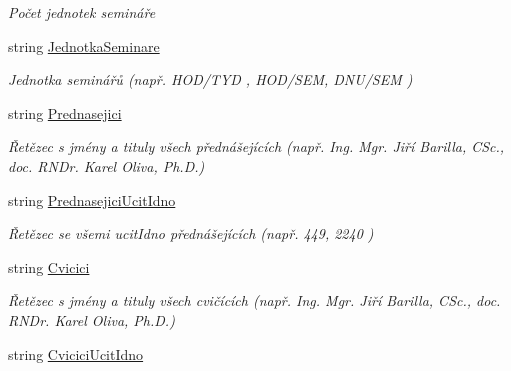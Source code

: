 \begin{DoxyCompactItemize}
\begin{DoxyCompactList}\small\item\em Počet jednotek semináře \end{DoxyCompactList}\item 
string \hyperlink{class_analyza_rozvrhu_1_1_s_t_a_g___classes_1_1_predmet_a0eb0af25bb20abd1ba14e225191828ed}{Jednotka\+Seminare}
\begin{DoxyCompactList}\small\item\em Jednotka seminářů (např. H\+O\+D/\+T\+YD , H\+O\+D/\+S\+EM, D\+N\+U/\+S\+EM ) \end{DoxyCompactList}\item 
string \hyperlink{class_analyza_rozvrhu_1_1_s_t_a_g___classes_1_1_predmet_a7deb6f732d1aa0f1aa32fb5dfabd7945}{Prednasejici}
\begin{DoxyCompactList}\small\item\em Řetězec s jmény a tituly všech přednášejících (např. \textquotesingle{}Ing. Mgr. Jiří Barilla, C\+Sc.\textquotesingle{}, \textquotesingle{}doc. R\+N\+Dr. Karel Oliva, Ph.\+D.\textquotesingle{}) \end{DoxyCompactList}\item 
string \hyperlink{class_analyza_rozvrhu_1_1_s_t_a_g___classes_1_1_predmet_a0f82f6a75d96f7908f4b9a905d69d608}{Prednasejici\+Ucit\+Idno}
\begin{DoxyCompactList}\small\item\em Řetězec se všemi ucit\+Idno přednášejících (např. 449, 2240 ) \end{DoxyCompactList}\item 
string \hyperlink{class_analyza_rozvrhu_1_1_s_t_a_g___classes_1_1_predmet_a6be1ecc5bee8228b90b61801f64a0d67}{Cvicici}
\begin{DoxyCompactList}\small\item\em Řetězec s jmény a tituly všech cvičících (např. \textquotesingle{}Ing. Mgr. Jiří Barilla, C\+Sc.\textquotesingle{}, \textquotesingle{}doc. R\+N\+Dr. Karel Oliva, Ph.\+D.\textquotesingle{}) \end{DoxyCompactList}\item 
string \hyperlink{class_analyza_rozvrhu_1_1_s_t_a_g___classes_1_1_predmet_ae59dc22b90a947f8674b9e108d16bac6}{Cvicici\+Ucit\+Idno}

\end{DoxyCompactItemize}
